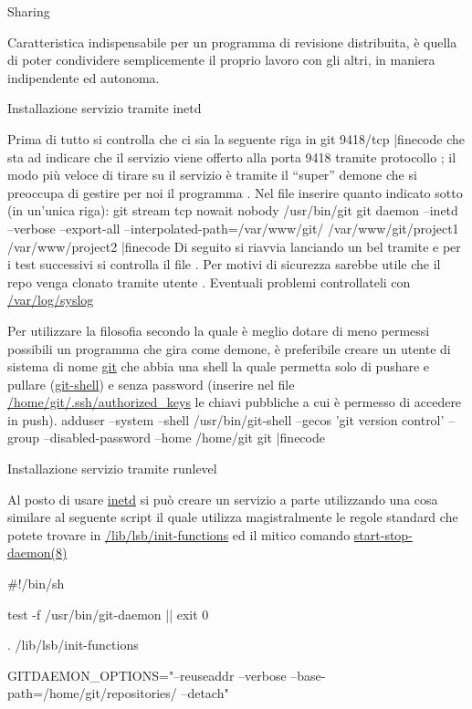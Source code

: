 \capitolo Sharing

Caratteristica indispensabile per un programma di revisione distribuita, \`e
quella di poter condividere semplicemente il proprio lavoro con gli altri, in
maniera indipendente ed autonoma.

\sezione Installazione servizio tramite inetd

Prima di tutto si controlla che ci sia la seguente riga in 
\iniziacode
git 9418/tcp
|finecode
che sta ad indicare che il servizio  viene offerto alla porta 9418
tramite protocollo ; il modo pi\`u veloce di tirare su il servizio \`e
tramite il ``super'' demone  che si preoccupa di gestire per noi
il programma . Nel file  inserire quanto
indicato sotto (in un'unica riga):
\iniziacode
git stream  tcp nowait  nobody  /usr/bin/git
  git daemon --inetd --verbose --export-all --interpolated-path=/var/www/git/%
  /var/www/git/project1
  /var/www/project2
|finecode
Di seguito si riavvia  lanciando un bel  tramite
 e per i test successivi si controlla il file
. Per motivi di sicurezza sarebbe utile che il repo venga
clonato tramite utente . Eventuali problemi controllateli con
\url{/var/log/syslog}

Per utilizzare la filosofia secondo la quale \`e meglio dotare di meno permessi
possibili un programma che gira come demone, \`e preferibile creare un utente di
sistema di nome \url{git} che abbia una shell la quale permetta solo di pushare
e pullare (\url{git-shell}) e senza password (inserire nel file
\url{/home/git/.ssh/authorized_keys} le chiavi pubbliche a cui \`e permesso di
accedere in push).
\iniziacode
adduser --system --shell /usr/bin/git-shell --gecos 'git version control'
--group --disabled-password --home /home/git git
|finecode

\sezione Installazione servizio tramite runlevel

Al posto di usare \url{inetd} si pu\`o creare un servizio a parte utilizzando
una cosa similare al seguente script il quale utilizza magistralmente le regole
standard che potete trovare in \url{/lib/lsb/init-functions} ed il mitico
comando \url{start-stop-daemon(8)}

\iniziacode
#!/bin/sh

test -f /usr/bin/git-daemon || exit 0

. /lib/lsb/init-functions

GITDAEMON_OPTIONS="--reuseaddr --verbose --base-path=/home/git/repositories/ --detach"

